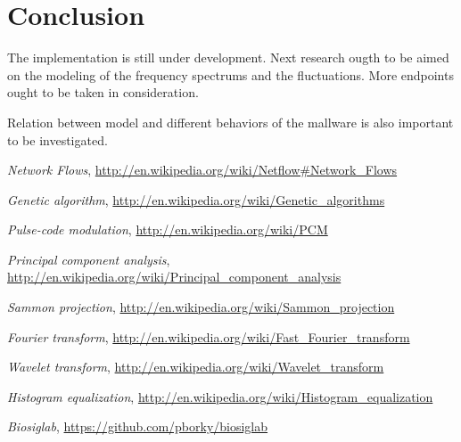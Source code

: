 \documentclass[a4paper,journal]{IEEEtran}
\begin{document}
\section{Conclusion}
The implementation is still under development. Next research ougth to be aimed on the modeling of the
frequency spectrums and the fluctuations. More endpoints ought to be taken in consideration. 

Relation between model and different behaviors of the mallware is also important to be investigated.


\begin{thebibliography}{1}

  \emph{Network Flows}, \url{http://en.wikipedia.org/wiki/Netflow#Network_Flows}
  
  \emph{Genetic algorithm}, \url{http://en.wikipedia.org/wiki/Genetic_algorithms}

\emph{Pulse-code modulation}, \url{http://en.wikipedia.org/wiki/PCM}

\emph{Principal component analysis}, \url{http://en.wikipedia.org/wiki/Principal_component_analysis}

\emph{Sammon projection}, \url{http://en.wikipedia.org/wiki/Sammon_projection}

\emph{Fourier transform}, \url{http://en.wikipedia.org/wiki/Fast_Fourier_transform}

\emph{Wavelet transform}, \url{http://en.wikipedia.org/wiki/Wavelet_transform}

\emph{Histogram equalization}, \url{http://en.wikipedia.org/wiki/Histogram_equalization}

\emph{Biosiglab}, \url{https://github.com/pborky/biosiglab}
\end{thebibliography}

\clearpage
\onecolumn
\appendix
\end{document}
